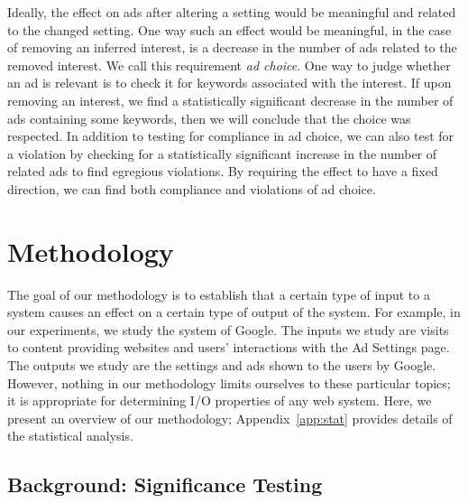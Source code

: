 \documentclass{article}
\begin{document}
Ideally, the effect on ads after altering a setting would be meaningful and related to the changed setting.
One way such an effect would be meaningful, in the case of removing an inferred interest, is a decrease in the number of ads related to the removed interest. We call this requirement \emph{ad choice}.
One way to judge whether an ad is relevant is to check it for keywords associated with the interest.  
If upon removing an interest, we find a statistically significant decrease in the number of ads containing some keywords, then we will conclude that the choice was respected.
In addition to testing for compliance in ad choice, we can also test for a violation by checking for a statistically significant increase in the number of related ads to find egregious violations.
By requiring the effect to have a fixed direction, we can find both compliance and violations of ad choice.













\section{Methodology}
\label{sec:meth}

The goal of our methodology is to establish that a certain type of input to a system causes an effect on a certain type of output of the system.  For example, in our experiments, we study the system of Google.  The inputs we study are visits to content providing websites and users' interactions with the Ad Settings page.  The outputs we study are the settings and ads shown to the users by Google.  However, nothing in our methodology limits ourselves to these particular topics; it is appropriate for determining I/O properties of any web system.
Here, we present an overview of our methodology; Appendix~\ref{app:stat} provides details of the statistical analysis.
\subsection{Background: Significance Testing}
\end{document}
